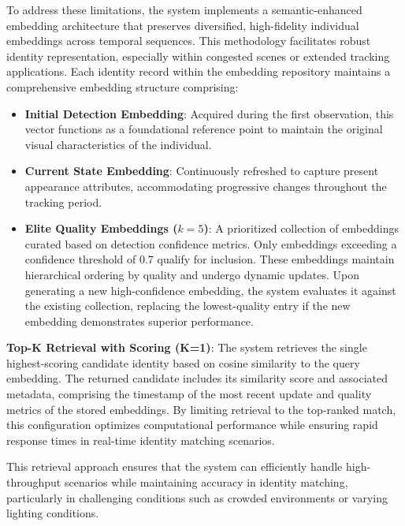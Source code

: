 To address these limitations, the system implements a semantic-enhanced embedding architecture that preserves diversified, high-fidelity individual embeddings across temporal sequences. This methodology facilitates robust identity representation, especially within congested scenes or extended tracking applications. Each identity record within the embedding repository maintains a comprehensive embedding structure comprising:

\begin{itemize}
    \item \textbf{Initial Detection Embedding}: Acquired during the first observation, this vector functions as a foundational reference point to maintain the original visual characteristics of the individual.
    \item \textbf{Current State Embedding}: Continuously refreshed to capture present appearance attributes, accommodating progressive changes throughout the tracking period.
    \item \textbf{Elite Quality Embeddings ($k=5$)}: A prioritized collection of embeddings curated based on detection confidence metrics. Only embeddings exceeding a confidence threshold of 0.7 qualify for inclusion. These embeddings maintain hierarchical ordering by quality and undergo dynamic updates. Upon generating a new high-confidence embedding, the system evaluates it against the existing collection, replacing the lowest-quality entry if the new embedding demonstrates superior performance.
\end{itemize}

\textbf{Top-K Retrieval with Scoring (K=1)}: The system retrieves the single highest-scoring candidate identity based on cosine similarity to the query embedding. The returned candidate includes its similarity score and associated metadata, comprising the timestamp of the most recent update and quality metrics of the stored embeddings. By limiting retrieval to the top-ranked match, this configuration optimizes computational performance while ensuring rapid response times in real-time identity matching scenarios.

This retrieval approach ensures that the system can efficiently handle high-throughput scenarios while maintaining accuracy in identity matching, particularly in challenging conditions such as crowded environments or varying lighting conditions.